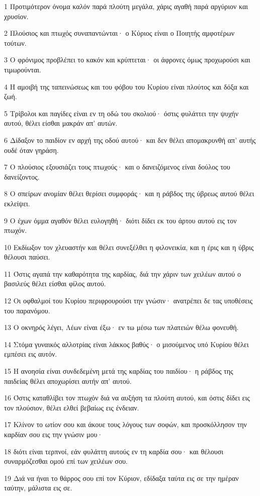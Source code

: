 \par 1 Προτιμότερον όνομα καλόν παρά πλούτη μεγάλα, χάρις αγαθή παρά αργύριον και χρυσίον.
\par 2 Πλούσιος και πτωχός συναπαντώνται· ο Κύριος είναι ο Ποιητής αμφοτέρων τούτων.
\par 3 Ο φρόνιμος προβλέπει το κακόν και κρύπτεται· οι άφρονες όμως προχωρούσι και τιμωρούνται.
\par 4 Η αμοιβή της ταπεινώσεως και του φόβου του Κυρίου είναι πλούτος και δόξα και ζωή.
\par 5 Τρίβολοι και παγίδες είναι εν τη οδώ του σκολιού· όστις φυλάττει την ψυχήν αυτού, θέλει είσθαι μακράν απ' αυτών.
\par 6 Δίδαξον το παιδίον εν αρχή της οδού αυτού· και δεν θέλει απομακρυνθή απ' αυτής ουδέ όταν γηράση.
\par 7 Ο πλούσιος εξουσιάζει τους πτωχούς· και ο δανειζόμενος είναι δούλος του δανείζοντος.
\par 8 Ο σπείρων ανομίαν θέλει θερίσει συμφοράς· και η ράβδος της ύβρεως αυτού θέλει εκλείψει.
\par 9 Ο έχων όμμα αγαθόν θέλει ευλογηθή· διότι δίδει εκ του άρτου αυτού εις τον πτωχόν.
\par 10 Εκδίωξον τον χλευαστήν και θέλει συνεξέλθει η φιλονεικία, και η έρις και η ύβρις θέλουσι παύσει.
\par 11 Όστις αγαπά την καθαρότητα της καρδίας, διά την χάριν των χειλέων αυτού ο βασιλεύς θέλει είσθαι φίλος αυτού.
\par 12 Οι οφθαλμοί του Κυρίου περιφρουρούσι την γνώσιν· ανατρέπει δε τας υποθέσεις του παρανόμου.
\par 13 Ο οκνηρός λέγει, Λέων είναι έξω· εν τω μέσω των πλατειών θέλω φονευθή.
\par 14 Στόμα γυναικός αλλοτρίας είναι λάκκος βαθύς· ο μισούμενος υπό Κυρίου θέλει εμπέσει εις αυτόν.
\par 15 Η ανοησία είναι συνδεδεμένη μετά της καρδίας του παιδίου· η ράβδος της παιδείας θέλει αποχωρίσει αυτήν απ' αυτού.
\par 16 Όστις καταθλίβει τον πτωχόν διά να αυξήση τα πλούτη αυτού, και όστις δίδει εις τον πλούσιον, θέλει ελθεί βεβαίως εις ένδειαν.
\par 17 Κλίνον το ωτίον σου και άκουε τους λόγους των σοφών, και προσκόλλησον την καρδίαν σου εις την γνώσιν μου·
\par 18 διότι είναι τερπνοί, εάν φυλάττη αυτούς εν τη καρδία σου· και θέλουσι συναρμόζεσθαι ομού επί των χειλέων σου.
\par 19 Διά να ήναι το θάρρος σου επί τον Κύριον, εδίδαξα ταύτα εις σε την ημέραν ταύτην, μάλιστα εις σε.
